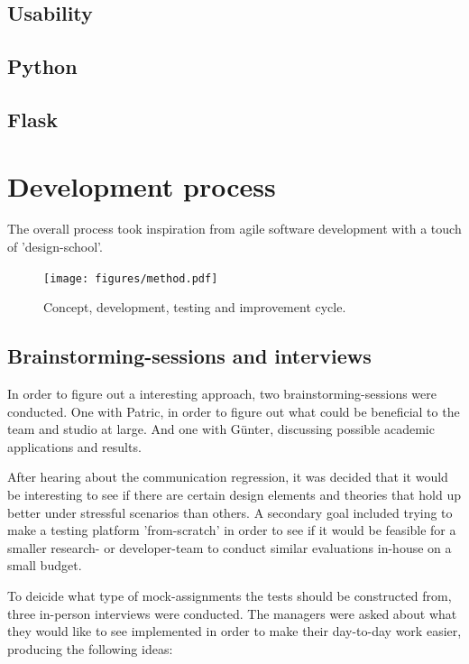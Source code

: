 \documentclass[nofilelist,dvipsnames]{cslthse-msc}
\begin{document}
    \section{Usability}

    \section{Python}

    \section{Flask}

	\chapter{Development process}

    The overall process took inspiration from agile software development with a
    touch of 'design-school'. 

    \begin{figure}[h!]
      \centering
      \texttt{[image: figures/method.pdf]}
      \caption{Concept, development, testing and improvement cycle.}
    \end{figure}

		\section{Brainstorming-sessions and interviews}

      In order to figure out a interesting approach, two brainstorming-sessions
      were conducted. One with Patric, in order to figure out what could be
      beneficial to the team and studio at large. And one with Günter,
      discussing possible academic applications and results.

      After hearing about the communication regression, it was decided that
      it would be interesting to see if there are certain design elements and
      theories that hold up better under stressful scenarios than others. A
      secondary goal included trying to make a testing platform 'from-scratch'
      in order to see if it would be feasible for a smaller research- or
      developer-team to conduct similar evaluations in-house on a small budget.

      To deicide what type of mock-assignments the tests should be constructed
      from, three in-person interviews were conducted. The managers were asked
      about what they would like to see implemented in order to make their
      day-to-day work easier, producing the following ideas:
\end{document}
